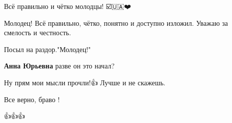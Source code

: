 \begin{itemize}
Всё правильно и чётко молодцы! ☑️🇺🇦❤️

 
Молодец! Всё правильно, чётко, понятно и доступно изложил. Уважаю за смелость и честность.

 
Посыл на раздор."Молодец!"

\begin{itemize}
 
\textbf{Анна Юрьевна} разве он это начал?
\end{itemize}

 
Ну прям мои мысли прочли!👍 Лучше и не скажешь.

 
Все верно, браво !

 
👍👍👍

 

\end{itemize}

